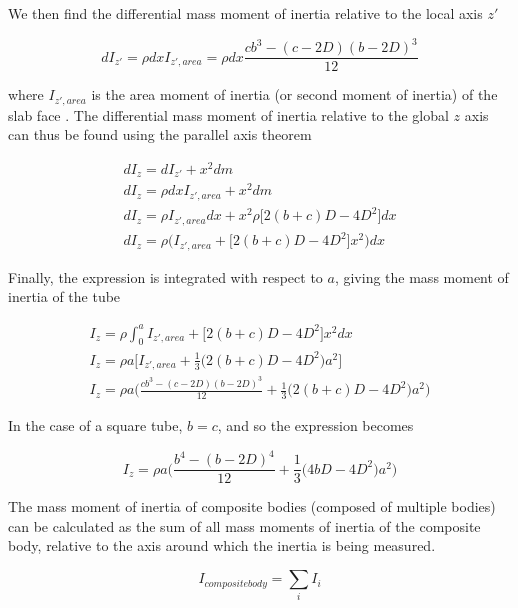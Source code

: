 We then find the differential mass moment of inertia relative to the local axis $z'$ \cite{ferdinand_mass_2016}

\begin{equation}
    dI_{z'} = \rho dx I_{z',area} = \rho dx \frac{cb^3 - (c-2D)(b-2D)^3}{12}
\end{equation}

where $I_{z',area}$ is the area moment of inertia (or second moment of inertia) of the slab face \cite{engineers_edge_area_nodate}.
The differential mass moment of inertia relative to the global $z$ axis can thus be found using the parallel axis theorem \cite{ferdinand_mass_2016}

\begin{gather}
    dI_z = dI_{z'} + x^2 dm
    \\
    dI_z = \rho dx I_{z',area} + x^2 dm
    \\
    dI_z = \rho I_{z',area} dx  + x^2 \rho\big[2(b+c)D-4D^2\big]dx
    \\
    dI_z = \rho \big( I_{z',area} + \big[2(b+c)D-4D^2\big] x^2 \big) dx
\end{gather}

Finally, the expression is integrated with respect to $a$, giving the mass moment of inertia of the tube

\begin{gather}
    I_z = \rho \int_0^a I_{z',area} + \big[2(b+c)D-4D^2\big] x^2 dx
    \\
    I_z = \rho a \big[ I_{z',area} + \frac{1}{3}\big(2(b+c)D-4D^2\big) a^2 \big]
    \\
    I_z = \rho a \big( \frac{c b^3 - (c-2D)(b-2D)^3}{12} + \frac{1}{3}\big(2(b+c)D-4D^2\big) a^2 \big)
\end{gather}

In the case of a square tube, $b = c$, and so the expression becomes

\begin{equation}
    I_z = \rho a \big( \frac{b^4 - (b-2D)^4}{12}  + \frac{1}{3}\big(4b D-4D^2\big) a^2\big)
\end{equation}

The mass moment of inertia of composite bodies (composed of multiple bodies) can be calculated as the sum of all mass moments of inertia of the composite body, relative to the axis around which the inertia is being measured.

\begin{equation}
    I_{composite body} = \sum_i I_i
\end{equation}

